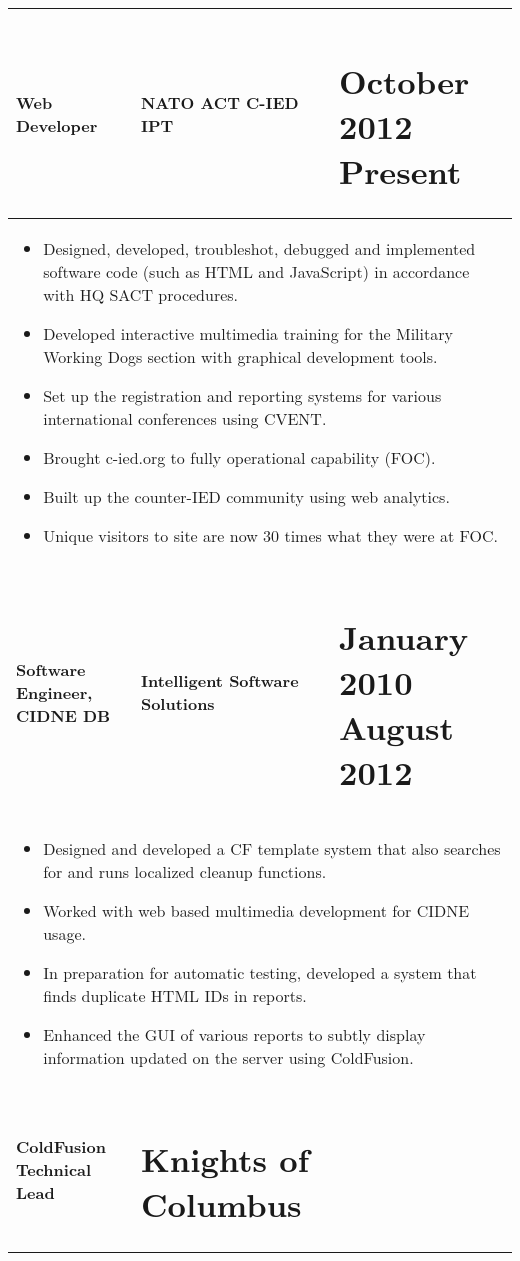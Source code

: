 \documentclass{scrbook}
\begin{document}
\begin{table}
\begin{tabularx}{\textwidth}{|
p{}|
p{}|
p{}|}
\textbf{Web Developer} & \centering\arraybackslash{}\textbf{NATO ACT C-IED IPT} & \section{October 2012 \textendash{} Present}
\\\hline 
\multicolumn{3}{|p{\dimexpr 1.001\linewidth-2\tabcolsep-2\arrayrulewidth}|}{
\begin{itemize}
\item Designed, developed, troubleshot, debugged and implemented software code (such as HTML and JavaScript) in accordance with HQ SACT procedures. 
\item Developed interactive multimedia training for the Military Working Dogs section with graphical development tools.
\item Set up the registration and reporting systems for various international conferences using CVENT.
\item Brought c-ied.org to fully operational capability (FOC).
\item Built up the counter-IED community using web analytics.
\item Unique visitors to site are now 30 times what they were at FOC.
\end{itemize}
} &\\\hline 
\textbf{Software Engineer, CIDNE DB} & \centering\arraybackslash{}\textbf{Intelligent Software Solutions} & \section{January 2010 \textendash{} August 2012}
\\\hline 
\multicolumn{3}{|p{\dimexpr 1.001\linewidth-2\tabcolsep-2\arrayrulewidth}|}{
\begin{itemize}
\item Designed and developed a CF template system that also searches for and runs localized cleanup functions.
\item Worked with web based multimedia development for CIDNE usage.
\item In preparation for automatic testing, developed a system that finds duplicate HTML IDs in reports.
\item Enhanced the GUI of various reports to subtly display information updated on the server using ColdFusion. 
\end{itemize}
} &\\\hline 
\textbf{ColdFusion Technical Lead} & \centering\arraybackslash{}\section{Knights of Columbus}


\end{tabularx}
\end{table}
\end{document}

